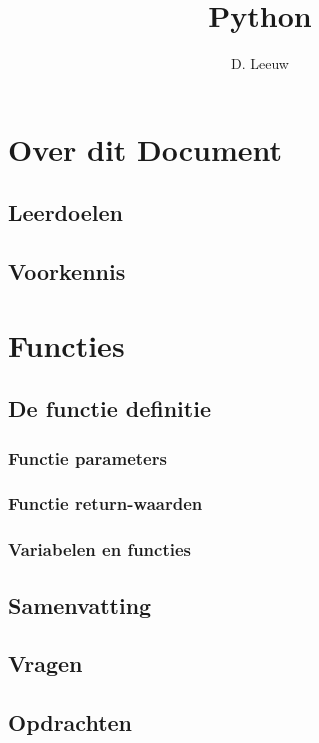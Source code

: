 \documentclass[a4paper,12pt,twoside,openright,titlepage]{article}
\author{D. Leeuw}
\title{Python}
\date{\today\\
1.1.0\\
\vfill
\raggedright
\copyright\ 2020-2025 Dennis Leeuw\\
}
\begin{document}

\maketitle


\section{Over dit Document}
\subsection{Leerdoelen}

\subsection{Voorkennis}



\section{Functies}

\subsection{De functie definitie}

\subsubsection{Functie parameters}

\subsubsection{Functie return-waarden}

\subsubsection{Variabelen en functies}

\subsection{Samenvatting}

\subsection{Vragen}

\subsection{Opdrachten}


\printindex
\end{document}
